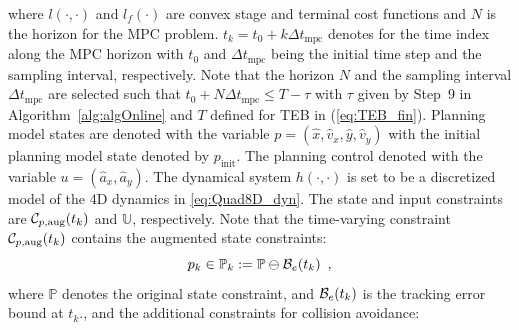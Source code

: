 %
where $l(\cdot,\cdot)$ and $l_f(\cdot)$ are convex stage and terminal cost functions and $N$ is the horizon for the MPC problem. 
$t_k = t_0 + k \Delta t_{\text{mpc}}$ denotes for the time index along the MPC horizon with $t_0$ and $\Delta t_{\text{mpc}}$ being the initial time step and the sampling interval, respectively. 
Note that the horizon $N$ and the sampling interval $\Delta t_{\text{mpc}}$ are selected such that $t_0 + N \Delta t_{\text{mpc}}\leq T - \tau$ with $\tau$ given by Step~9 in Algorithm~\ref{alg:algOnline} and $T$ defined for TEB in (\ref{eq:TEB_fin}). 
Planning model states are denoted with the variable $p = (\hat x, \hat v_x, \hat y, \hat v_y)$ with the initial planning model state denoted by $p_{\text{init}}$.
The planning control denoted with the variable $u = (\hat a_x, \hat a_y)$.
The dynamical system $h(\cdot,\cdot)$ is set to be a discretized model of the 4D dynamics in \eqref{eq:Quad8D_dyn}. The state and input constraints are $\mathcal C_{p,\text{aug}}(t_k)$ and $\mathbb{U}$, respectively. Note that the time-varying constraint $\mathcal C_{p,\text{aug}}(t_k)$ contains the augmented state constraints:
%
\begin{equation}
p_k \in \mathbb{P}_k :=\mathbb{P}\ominus\mathcal B_e(t_k) \enspace ,
\end{equation}
%
where $\mathbb{P}$ denotes the original state constraint, and $\mathcal B_e(t_k)$ is the tracking error bound at $t_k$., and the additional constraints for collision avoidance:

